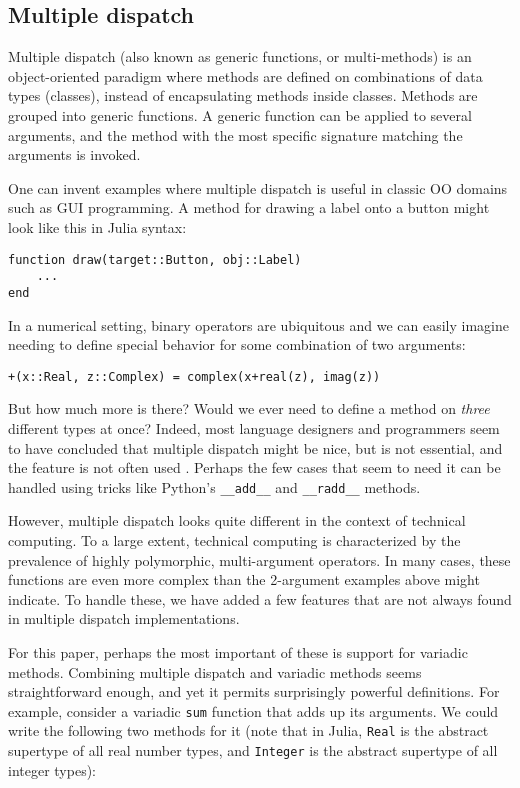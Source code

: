 \documentclass[preprint]{sigplanconf}
\newcommand{\code}[1]{\texttt{#1}}
\begin{document}
\subsection{Multiple dispatch}

Multiple dispatch (also known as generic functions, or multi-methods) is an
object-oriented paradigm where methods are defined on combinations of data
types (classes), instead of encapsulating methods inside classes. Methods are
grouped into generic functions. A generic function can be applied to several
arguments, and the method with the most specific signature matching the
arguments is invoked.

One can invent examples where multiple dispatch is useful in classic OO domains
such as GUI programming. A method for drawing a label onto a button might
look like this in Julia syntax:

\begin{verbatim}
function draw(target::Button, obj::Label)
    ...
end
\end{verbatim}

In a numerical setting, binary operators are ubiquitous and we can easily imagine
needing to define special behavior for some combination of two arguments:

\begin{verbatim}
+(x::Real, z::Complex) = complex(x+real(z), imag(z))
\end{verbatim}

But how much more is there? Would we ever need to define a method on
\emph{three} different types at once? Indeed, most language designers and
programmers seem to have concluded that multiple dispatch might be nice, but is
not essential, and the feature is not often used \cite{Muschevici:2008}.
Perhaps the few cases that seem to need it can be handled using tricks like
Python's \code{\_\_add\_\_} and \code{\_\_radd\_\_} methods.

However, multiple dispatch looks quite different in the context of technical
computing. To a large extent, technical computing is characterized
by the prevalence of highly polymorphic, multi-argument operators. In many
cases, these functions are even more complex than the 2-argument
examples above might indicate. To handle these, we have added a few
features that are not always found in multiple dispatch implementations.

For this paper, perhaps the most important of these is support for
variadic methods. Combining multiple dispatch and variadic methods
seems straightforward
enough, and yet it permits surprisingly powerful definitions. For example,
consider a variadic \code{sum} function that adds up its arguments. We could
write the following two methods for it (note that in Julia, \code{Real} is
the abstract supertype of all real number types, and \code{Integer} is the
abstract supertype of all integer types):
\end{document}
